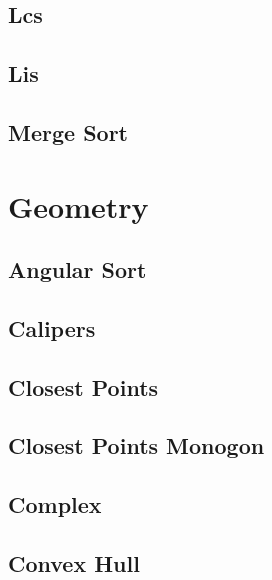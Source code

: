 \documentclass[10pt,landscape,twocolumn,a4paper,notitlepage]{article}
\newcommand\cppfile[2][]{

}
\begin{document}
\subsection{Lcs}
\cppfile{dp/LCS.cpp}

\subsection{Lis}
\cppfile{dp/LIS.cpp}

\subsection{Merge Sort}
\cppfile{dp/merge_Sort.cpp}

\newpage


\section{Geometry}

\subsection{Angular Sort}
\cppfile{geometry/angular_sort.cpp}

\subsection{Calipers}
\cppfile{geometry/calipers.cpp}

\subsection{Closest Points}
\cppfile{geometry/closest_points.cpp}

\subsection{Closest Points Monogon}
\cppfile{geometry/closest_points_Monogon.cpp}

\subsection{Complex}
\cppfile{geometry/complex.cpp}

\subsection{Convex Hull}
\cppfile{geometry/convex_hull.cpp}
\end{document}
